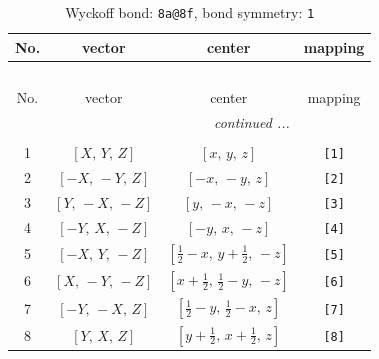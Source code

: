 \documentclass[fleqn,8pt]{jsarticle}
\begin{document}
\begin{longtable}{cccc}
\caption{Wyckoff bond: {\tt 8a@8f}, bond symmetry: {\tt 1}}
 \\
 \hline \hline
No. & vector & center & mapping \\ \hline \endfirsthead

\multicolumn{3}{l}{\tablename\ \thetable{}} \\
 \hline \hline
No. & vector & center & mapping \\ \hline \endhead

 \hline \hline
\multicolumn{3}{r}{\footnotesize\it continued ...} \\ \endfoot

 \hline \hline
\multicolumn{3}{r}{} \\ \endlastfoot

1 & $\left[ X,\, Y,\, Z \right]$ & $\left[ x,\, y,\, z \right]$ & {\tt [1]} \\ \hline
2 & $\left[ - X,\, - Y,\, Z \right]$ & $\left[ - x,\, - y,\, z \right]$ & {\tt [2]} \\ \hline
3 & $\left[ Y,\, - X,\, - Z \right]$ & $\left[ y,\, - x,\, - z \right]$ & {\tt [3]} \\ \hline
4 & $\left[ - Y,\, X,\, - Z \right]$ & $\left[ - y,\, x,\, - z \right]$ & {\tt [4]} \\ \hline
5 & $\left[ - X,\, Y,\, - Z \right]$ & $\left[ \frac{1}{2} - x,\, y + \frac{1}{2},\, - z \right]$ & {\tt [5]} \\ \hline
6 & $\left[ X,\, - Y,\, - Z \right]$ & $\left[ x + \frac{1}{2},\, \frac{1}{2} - y,\, - z \right]$ & {\tt [6]} \\ \hline
7 & $\left[ - Y,\, - X,\, Z \right]$ & $\left[ \frac{1}{2} - y,\, \frac{1}{2} - x,\, z \right]$ & {\tt [7]} \\ \hline
8 & $\left[ Y,\, X,\, Z \right]$ & $\left[ y + \frac{1}{2},\, x + \frac{1}{2},\, z \right]$ & {\tt [8]} \\
\end{longtable}
\end{document}
